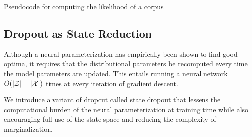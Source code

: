 \documentclass[11pt,a4paper]{article}
\begin{document}
\begin{algorithm*}%
\begin{algorithmic}
    \EndFor
\EndFunction
{}
    \EndFor
\EndFunction
\begin{comment}
\Function{LogPotentials}{}
    \State{Given sequence $\bx = \langle x_1,\ldots,x_T \rangle$,
    constraints $\mcC_x$ with $|\mcC_x| = k$,
    transition parameters $\psi$,
    and emission parameters $\phi$}
    \State{Initialize $\Phi \in \mathbb{R}^{T \times k \times k} = 0$}
    \ForAll{$t\in \set{1,\ldots,T}$}
        \State{Set $\Phi[t,:,:] += \psi[x]$}
        \State{Set $\Phi[t,:,:] += \psi[x]$}
    \EndFor
    \State \Return meh \Comment{$O(1)$}
\EndFunction
\Function{Forward}{}
    \For{meh}
        \State{meh}
    \EndFor
    \State \Return meh \Comment{$O(1)$}
\EndFunction
\end{comment}
\end{algorithmic}
\caption{
\label{fig:algo}
Pseudocode for computing the likelihood of a corpus
}
\end{algorithm*}


\subsection{Dropout as State Reduction}
Although a neural parameterization has empirically been shown to find good optima,
it requires that the distributional parameters be recomputed every time the
model parameters are updated.
This entails running a neural network $O(|\mathcal{Z}| + |\mathcal{X}|)$ times 
at every iteration of gradient descent.

We introduce a variant of dropout called state dropout that lessens
the computational burden of the neural parameterization at training time
while also encouraging full use of the state space and 
reducing the complexity of marginalization.
\end{document}
